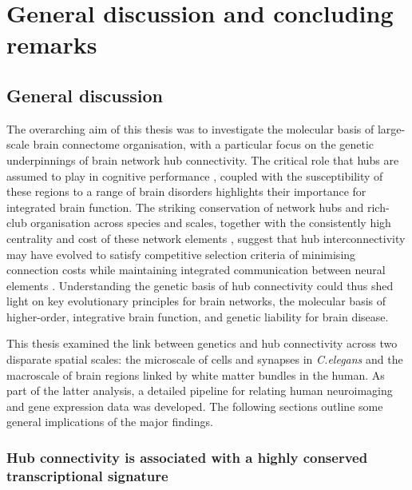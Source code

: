 \chapter{General discussion and concluding \\ remarks}
\label{ch:Discussion}

\section{General discussion}
The overarching aim of this thesis was to investigate the molecular basis of large-scale brain connectome organisation, with a particular focus on the genetic underpinnings of brain network hub connectivity. The critical role that hubs are assumed to play in cognitive performance \mbox{\citep{Buckner2009}}, coupled with the susceptibility of these regions to a range of brain disorders \citep{Bassett2009a,Crossley2014,Fornito2015} highlights their importance for integrated brain function. The striking conservation of network hubs and rich-club organisation across species and scales, together with the consistently high centrality and cost of these network elements \citep{VandenHeuvel2016}, suggest that hub interconnectivity may have evolved to satisfy competitive selection criteria of minimising connection costs while maintaining integrated communication between neural elements \citep{Bullmore2012}. Understanding the genetic basis of hub connectivity could thus shed light on key evolutionary principles for brain networks, the molecular basis of higher-order, integrative brain function, and genetic liability for brain disease.

This thesis examined the link between genetics and hub connectivity across two disparate spatial scales: the microscale of cells and synapses in \textit{C.elegans} and the macroscale of brain regions linked by white matter bundles in the human. As part of the latter analysis, a detailed pipeline for relating human neuroimaging and gene expression data was developed. The following sections outline some general implications of the major findings.

\subsection*{Hub connectivity is associated with a highly conserved transcriptional signature}

